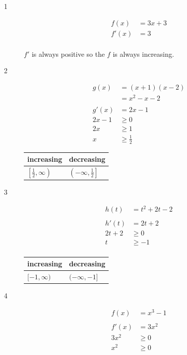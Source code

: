 \documentclass[fleqn]{exam}
\begin{document}
\begin{description}

\item[1]
\begin{align*}
  f(x)  &= 3x + 3 \\
  f'(x) & = 3 \\
\end{align*}

$f'$ is always positive so the $f$ is always increasing.

\item[2]
\begin{align*}
  g(x)  &= (x + 1)(x - 2) \\
        &= x^2 - x - 2 \\
\\
  g'(x) & = 2x - 1 \\
  2x - 1 &\geq 0 \\
  2x &\geq 1 \\
  x &\geq \frac{1}{2}
\end{align*}

\begin{tabular}{ll}
\toprule
increasing & decreasing \\
\midrule
$\left[\frac{1}{2}, \infty \right)$ & $\left( -\infty, \frac{1}{2} \right]$ \\
\bottomrule
\end{tabular}

\item[3]
\begin{align*}
  h(t) &= t^2 + 2t - 2 \\
\\
  h'(t) & = 2t + 2 \\
  2t + 2 &\geq 0 \\
  t &\geq -1 \\
\end{align*}

\begin{tabular}{ll}
\toprule
increasing & decreasing  \\
\midrule
$[-1, \infty)$ & $( -\infty, -1]$  \\
\bottomrule
\end{tabular}

\item[4]
\begin{align*}
  f(x) &= x^3 - 1 \\
\\
  f'(x) & = 3x^2 \\
  3x^2 &\geq 0 \\
  x^2 &\geq 0 \\
\end{align*}


\end{description}
\end{document}
